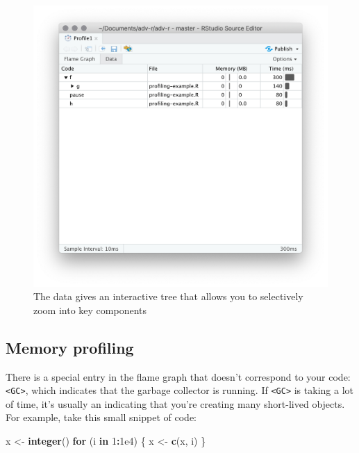 \documentclass[]{book}
\newenvironment{Shaded}{\begin{snugshade}}{\end{snugshade}}
\newcommand{\ControlFlowTok}[1]{\textcolor[rgb]{0.27,0.27,0.27}{\textbf{#1}}}
\newcommand{\DecValTok}[1]{\textcolor[rgb]{0.06,0.06,0.06}{#1}}
\newcommand{\FloatTok}[1]{\textcolor[rgb]{0.06,0.06,0.06}{#1}}
\newcommand{\KeywordTok}[1]{\textcolor[rgb]{0.27,0.27,0.27}{\textbf{#1}}}
\newcommand{\NormalTok}[1]{#1}
\newcommand{\OperatorTok}[1]{\textcolor[rgb]{0.43,0.43,0.43}{\textbf{#1}}}
\newcommand{\StringTok}[1]{\textcolor[rgb]{0.5,0.5,0.5}{#1}}
\begin{document}
\begin{figure}

{\centering \includegraphics[width=1\linewidth]{screenshots/performance/tree} 

}

\caption{The data gives an interactive tree that allows you to selectively zoom into key components}\label{fig:perf-tree}
\end{figure}

\hypertarget{memory-profiling}{%
\subsection{Memory profiling}\label{memory-profiling}}


There is a special entry in the flame graph that doesn't correspond to your code: \texttt{\textless{}GC\textgreater{}}, which indicates that the garbage collector is running. If \texttt{\textless{}GC\textgreater{}} is taking a lot of time, it's usually an indicating that you're creating many short-lived objects. For example, take this small snippet of code:

\begin{Shaded}
\begin{Highlighting}[]
\NormalTok{x <-}\StringTok{ }\KeywordTok{integer}\NormalTok{()}
\ControlFlowTok{for}\NormalTok{ (i }\ControlFlowTok{in} \DecValTok{1}\OperatorTok{:}\FloatTok{1e4}\NormalTok{) \{}
\NormalTok{  x <-}\StringTok{ }\KeywordTok{c}\NormalTok{(x, i)}
\NormalTok{\}}
\end{Highlighting}
\end{Shaded}
\end{document}
